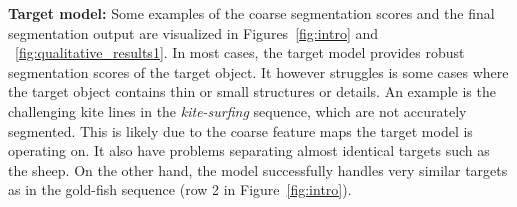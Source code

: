 \noindent\textbf{Target model:} Some examples of the coarse segmentation scores and the final segmentation output are visualized in Figures~\ref{fig:intro} and ~\ref{fig:qualitative_results1}. In most cases, the target model provides robust segmentation scores of the target object. It however struggles is some cases where the target object contains thin or small structures or details. An example is the challenging kite lines in the \emph{kite-surfing} sequence, which are not accurately segmented.
This is likely due to the coarse feature maps the target model is operating on. It also have problems separating almost identical targets such as the sheep. On the other hand, the model successfully handles very similar targets as in the gold-fish sequence (row 2 in Figure~\ref{fig:intro}). 
